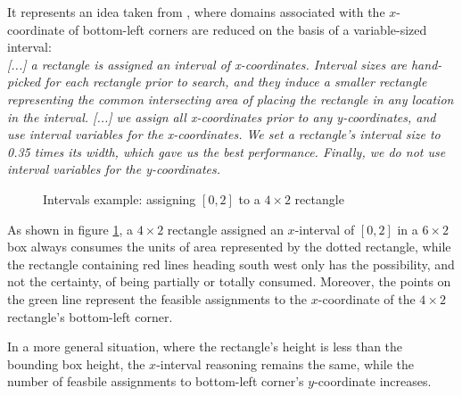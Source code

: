 \documentclass[a4paper,10pt]{article}
\newcounter{subsubsubsection}[subsubsection]
\begin{document}
 \label{sec:intervals-approach}
It represents an idea taken from \cite{rect-packing}, where domains associated with the $x$-coordinate of bottom-left corners are reduced on the basis of a variable-sized interval:\\
\emph{[...] a rectangle is assigned an interval of x-coordinates. Interval sizes are hand-picked for each rectangle prior to search, and they induce a smaller rectangle representing the common intersecting area of placing the rectangle in any location in the interval. [...] we assign all x-coordinates prior to any y-coordinates, and use interval variables for the x-coordinates. We set a rectangle’s interval size to 0.35 times its width, which gave us the best performance. Finally, we do not use interval variables for the y-coordinates.}

\begin{figure}[h]
   \centering
   \caption{Intervals example: assigning $[0,2]$ to a $4\times2$ rectangle}
   \label{fig:intervals}
\end{figure}

As shown in figure \ref{fig:intervals}, a $4\times2$ rectangle assigned an $x$-interval of $[0,2]$ in a $6\times2$ box always consumes the units of area represented by the dotted rectangle,
while the rectangle containing red lines heading south west only has the possibility, and not the certainty, of being partially or totally consumed.
Moreover, the points on the green line represent the feasible assignments to the $x$-coordinate of the $4\times2$ rectangle's bottom-left corner.

In a more general situation, where the rectangle's height is less than the bounding box height, the $x$-interval reasoning remains the same, while the number of feasbile assignments to bottom-left corner's $y$-coordinate increases.
\end{document}
